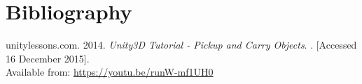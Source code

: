 \section{Bibliography}
\begin{thebibliography}{widestlabel}
	unitylessons.com. 2014. \textit{Unity3D Tutorial - Pickup and Carry Objects}.
	\newline
	[Online]. [Accessed 16 December 2015].\\
	Available from: \url{https://youtu.be/runW-mf1UH0}
	
	
\end{thebibliography}